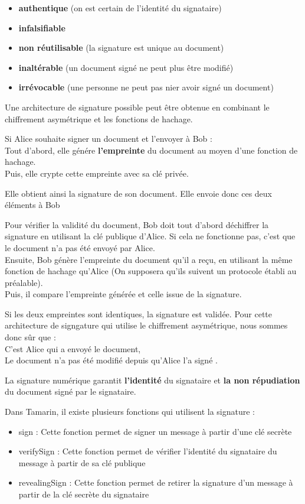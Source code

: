 \documentclass[conference]{IEEEtran}
\begin{document}
\begin{itemize}
    \item \textbf{authentique} (on est certain de l'identité du signataire)
    \item \textbf{infalsifiable}
    \item \textbf{non réutilisable} (la signature est unique au document)
    \item \textbf{inaltérable} (un document signé ne peut plus être modifié)
    \item \textbf{irrévocable} (une personne ne peut pas nier avoir signé un document)
\end{itemize}

\vspace{0.3cm}
Une architecture de signature possible peut être obtenue en combinant le chiffrement asymétrique et les fonctions de hachage.

Si Alice souhaite signer un document et l'envoyer à Bob : \\
    Tout d'abord, elle génére \textbf{l'empreinte} du document au moyen d'une fonction de hachage.\\
    Puis, elle crypte cette empreinte avec sa clé privée.

    Elle obtient ainsi la signature de son document. Elle envoie donc ces deux éléments à Bob

    Pour vérifier la validité du document, Bob doit tout d'abord déchiffrer la signature en utilisant la clé publique d'Alice. Si cela ne fonctionne pas, c'est que le document n'a pas été envoyé par Alice.\\
    Ensuite, Bob génère l'empreinte du document qu'il a reçu, en utilisant la même fonction de hachage qu'Alice (On supposera qu'ils suivent un protocole établi au préalable).\\
    Puis, il compare l'empreinte générée et celle issue de la signature.

    Si les deux empreintes sont identiques, la signature est validée. Pour cette architecture de signgature qui utilise le chiffrement asymétrique, nous sommes donc sûr que : \\
        C'est Alice qui a envoyé le document, \\
        Le document n'a pas été modifié depuis qu'Alice l'a signé \cite{igmsign}.


La signature numérique garantit \textbf{l'identité} du signataire et \textbf{la non répudiation} du document signé par le signataire.

Dans Tamarin, il existe plusieurs fonctions qui utilisent la signature :
\begin{itemize}
    \item sign : Cette fonction permet de signer un message à partir d'une clé secrète
    \item verifySign : Cette fonction permet de vérifier l'identité du signataire du message à partir de sa clé publique
    \item revealingSign : Cette fonction permet de retirer la signature d'un message à partir de la clé secrète du signataire
\end{itemize}
\end{document}
